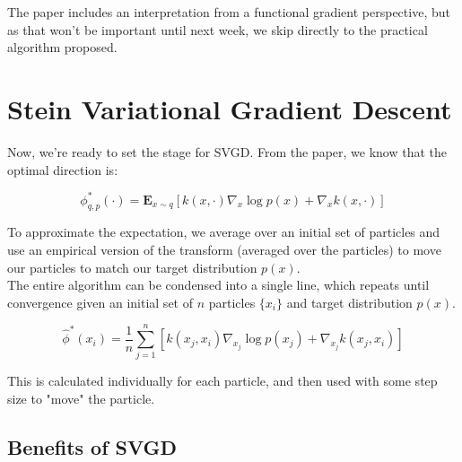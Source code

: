 \documentclass[12pt]{article}
\begin{document}
\noindent The paper includes an interpretation from a functional gradient perspective, but as that won't be important until next week, we skip directly to the practical algorithm proposed. 

\section{Stein Variational Gradient Descent}

Now, we're ready to set the stage for SVGD. From the paper, we know that the optimal direction is:

\begin{equation}
    \phi^*_{q, p}(\cdot) = \mathbf{E}_{x \sim q} [k(x, \cdot)\nabla_x \log p(x) + \nabla_x k(x, \cdot)]
\end{equation}

\noindent To approximate the expectation, we average over an initial set of particles and use an empirical version of the transform (averaged over the particles) to move our particles to match our target distribution $p(x)$.  \\

\noindent The entire algorithm can be condensed into a single line, which repeats until convergence given an initial set of $n$ particles $\{ x_i \}$ and target distribution $p(x)$.

\begin{equation}
    \hat \phi^*(x_i) = \frac{1}{n} \sum^n_{j=1}[k(x_j, x_i)\nabla_{x_j} \log p(x_j) + \nabla_{x_j} k(x_j, x_i)]
\end{equation}

\noindent This is calculated individually for each particle, and then used with some step size to "move" the particle. 

\subsection{Benefits of SVGD}
\end{document}
